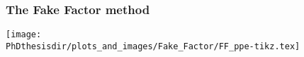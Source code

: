 \begin{frame}
\frametitle{The Fake Factor method}
\vspace{-20pt}
\begin{center}
\texttt{[image: \\PhDthesisdir/plots\_and\_images/Fake\_Factor/FF\_ppe-tikz.tex]}
\end{center}
\vspace{-10pt}
\end{frame}
